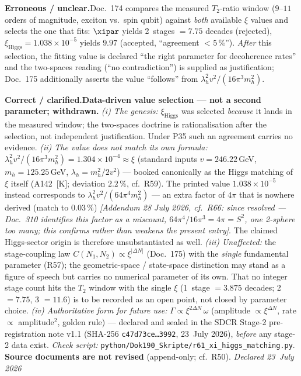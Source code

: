 \smallskip\noindent\textbf{Erroneous / unclear.}\quad Doc.~174 compares the measured $T_2$-ratio window ($9$--$11$ orders of magnitude, exciton vs.\ spin qubit) against \emph{both} available $\xi$ values and selects the one that fits: $\xipar$ yields 2~stages $=7.75$ decades (rejected), $\xi_\text{Higgs}=1.038\times10^{-5}$ yields $9.97$ (accepted, \enquote{agreement $<5\,\%$}). \emph{After} this selection, the fitting value is declared \enquote{the right parameter for decoherence rates} and the two-spaces reading (\enquote{no contradiction}) is supplied as justification; Doc.~175 additionally asserts the value \enquote{follows} from $\lambda_h^2 v^2/(16\pi^3 m_h^2)$.


\smallskip\noindent\textbf{Correct / clarified.}\quad \textbf{Data-driven value selection --- not a second parameter; withdrawn.} \emph{(i) The genesis:} $\xi_\text{Higgs}$ was selected \emph{because} it lands in the measured window; the two-spaces doctrine is rationalisation after the selection, not independent justification. Under P35 such an agreement carries no evidence. \emph{(ii) The value does not match its own formula:} $\lambda_h^2 v^2/(16\pi^3 m_h^2)=1.304\times10^{-4}\approx\xi$ (standard inputs $v=246.22$\,GeV, $m_h=125.25$\,GeV, $\lambda_h=m_h^2/2v^2$) --- booked canonically as the Higgs matching of $\xi$ itself (A142~[K]; deviation $2.2\,\%$, cf.\ R59). The printed value $1.038\times10^{-5}$ instead corresponds to $\lambda_h^2 v^2/(64\pi^4 m_h^2)$ --- an extra factor of $4\pi$ that is nowhere derived (match to $0.03\,\%$) \emph{[Addendum 28 July 2026, cf.\ R66: since resolved --- Doc.~310 identifies this factor as a miscount, $64\pi^4/16\pi^3 = 4\pi = S^2$, one 2-sphere too many; this confirms rather than weakens the present entry]}. The claimed Higgs-sector origin is therefore unsubstantiated as well. \emph{(iii) Unaffected:} the stage-coupling law $C(N_1,N_2)\propto\xi^{|\Delta N|}$ (Doc.~175) with the \emph{single} fundamental parameter (R57); the geometric-space / state-space distinction may stand as a figure of speech but carries no numerical parameter of its own. That no integer stage count hits the $T_2$ window with the single $\xi$ (1~stage $=3.875$ decades; 2 $=7.75$, 3 $=11.6$) is to be recorded as an open point, not closed by parameter choice. \emph{(iv) Authoritative form for future use:} $\Gamma \propto \xi^{2\Delta N}\,\omega$ (amplitude $\propto \xi^{\Delta N}$, rate $\propto$ amplitude$^2$, golden rule) --- declared and sealed in the SDCR Stage-2 pre-registration note v1.1 (SHA-256 \texttt{c47d73ce\ldots{}3992}, 23~July 2026), \emph{before} any stage-2 data exist. \emph{Check script:} \texttt{python/Dok190\_Skripte/r61\_xi\_higgs\_matching.py}. \textbf{Source documents are not revised} (append-only; cf.\ R50). \emph{Declared 23~July 2026}


